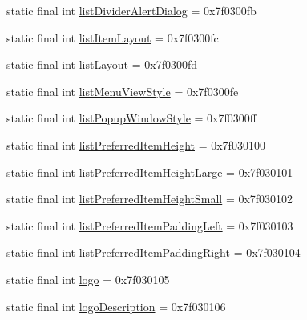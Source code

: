 \begin{DoxyCompactItemize}
\item 
static final int \mbox{\hyperlink{classandroid_1_1support_1_1v7_1_1appcompat_1_1R_1_1attr_ac91bf37c926c3ae613ac7aa6a154ec8f}{list\+Divider\+Alert\+Dialog}} = 0x7f0300fb
\item 
static final int \mbox{\hyperlink{classandroid_1_1support_1_1v7_1_1appcompat_1_1R_1_1attr_a5f32cb9405a590842e40ec2f6fa378fb}{list\+Item\+Layout}} = 0x7f0300fc
\item 
static final int \mbox{\hyperlink{classandroid_1_1support_1_1v7_1_1appcompat_1_1R_1_1attr_a8e2142f72964f234bab10106c406d308}{list\+Layout}} = 0x7f0300fd
\item 
static final int \mbox{\hyperlink{classandroid_1_1support_1_1v7_1_1appcompat_1_1R_1_1attr_aa3ec9b98b82a1e81834a1937e7de9bc2}{list\+Menu\+View\+Style}} = 0x7f0300fe
\item 
static final int \mbox{\hyperlink{classandroid_1_1support_1_1v7_1_1appcompat_1_1R_1_1attr_a2dc07694cb6cde8edf0e8c8036474f6b}{list\+Popup\+Window\+Style}} = 0x7f0300ff
\item 
static final int \mbox{\hyperlink{classandroid_1_1support_1_1v7_1_1appcompat_1_1R_1_1attr_a0e2ba60f625823a7581c9eedd3497b86}{list\+Preferred\+Item\+Height}} = 0x7f030100
\item 
static final int \mbox{\hyperlink{classandroid_1_1support_1_1v7_1_1appcompat_1_1R_1_1attr_a335034596085454988321b794dfdf279}{list\+Preferred\+Item\+Height\+Large}} = 0x7f030101
\item 
static final int \mbox{\hyperlink{classandroid_1_1support_1_1v7_1_1appcompat_1_1R_1_1attr_a12e1c5226243623cef536b891be132f1}{list\+Preferred\+Item\+Height\+Small}} = 0x7f030102
\item 
static final int \mbox{\hyperlink{classandroid_1_1support_1_1v7_1_1appcompat_1_1R_1_1attr_a845e0d5d4421edf116e3881087e2a18e}{list\+Preferred\+Item\+Padding\+Left}} = 0x7f030103
\item 
static final int \mbox{\hyperlink{classandroid_1_1support_1_1v7_1_1appcompat_1_1R_1_1attr_ad78a5b3a01015c2cccf543dd095a4eb6}{list\+Preferred\+Item\+Padding\+Right}} = 0x7f030104
\item 
static final int \mbox{\hyperlink{classandroid_1_1support_1_1v7_1_1appcompat_1_1R_1_1attr_a50c20be0b5db38a3b985474a79edc0de}{logo}} = 0x7f030105
\item 
static final int \mbox{\hyperlink{classandroid_1_1support_1_1v7_1_1appcompat_1_1R_1_1attr_a5d3fd08ef454b031b42925c33a6b0333}{logo\+Description}} = 0x7f030106
\item 

\end{DoxyCompactItemize}
